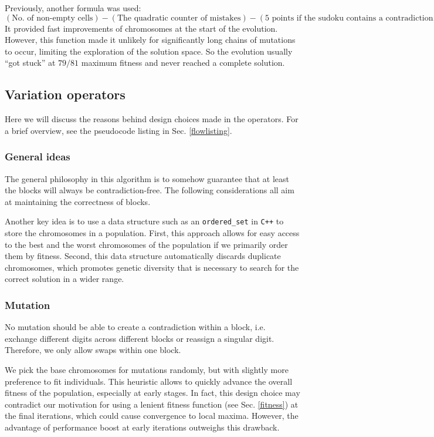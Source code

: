 \documentclass[10pt]{article}
\begin{document}
Previously, another formula was used:
\[(\textrm{No. of non-empty cells}) - (\textrm{The quadratic counter of mistakes})
    - (\textrm{5 points if the sudoku contains a contradiction, else 0}).\]
It provided fast improvements of chromosomes at the start of the evolution.
However, this function made it unlikely for significantly long chains of mutations to
occur, limiting the exploration of the solution space. So the evolution usually
``got stuck'' at $79/81$ maximum fitness and never reached a complete solution.

\subsection{Variation operators}
Here we will discuss the reasons behind design choices made in the operators.
For a brief overview, see the pseudocode listing in Sec. \ref{flowlisting}.

\subsubsection{General ideas}
The general philosophy in this algorithm is to somehow guarantee that at least
the blocks will always be contradiction-free. The following considerations all
aim at maintaining the correctness of blocks.

Another key idea is to use a data structure such as an \texttt{ordered\_set} in \texttt{C++}
to store the chromosomes in a population. First, this approach allows for easy
access to the best and the worst chromosomes of the population if we primarily
order them by fitness. Second, this data structure automatically discards duplicate
chromosomes, which promotes genetic diversity that is necessary to search for
the correct solution in a wider range.

\subsubsection{Mutation}
No mutation should be able to create a contradiction within a block, i.e.
exchange different digits across different blocks or reassign a singular digit.
Therefore, we only allow swaps within one block.

We pick the base chromosomes for mutations randomly, but with slightly more preference
to fit individuals. This heuristic allows to quickly advance the overall fitness
of the population, especially at early stages. In fact, this design choice may
contradict our motivation for using a lenient fitness function (see Sec. \ref{fitness})
at the final iterations, which could cause convergence to local maxima. However,
the advantage of performance boost at early iterations outweighs this drawback.
\end{document}
